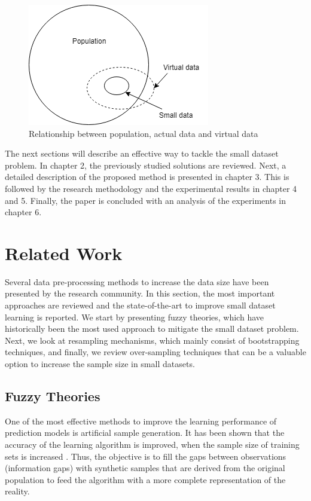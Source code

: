 \documentclass[parskip=full]{scrartcl}
\begin{document}
\begin{figure}[H]
	\centering
	\includegraphics[width=0.35\linewidth]{./resources/relationship}
	\caption{Relationship between population, actual data and virtual data \cite{Li.2006}}
	\label{fig:relationship}
\end{figure}

The next sections will describe an effective way to tackle the small dataset 
problem. In chapter 2, the previously studied solutions are reviewed. Next, a 
detailed description of the proposed method is presented in chapter 3. This is 
followed by the research methodology and the experimental results in chapter 4 
and 5. Finally, the paper is concluded with an analysis of the experiments in 
chapter 6.

\section{Related Work}
Several data pre-processing methods to increase the data size have been
presented by the research community. In this section, the most important
approaches are reviewed and the state-of-the-art to improve small dataset
learning is reported. We start by presenting fuzzy theories, which have 
historically been the most used approach to mitigate the small dataset problem. 
Next, we look at resampling mechanisms, which mainly consist of bootstrapping 
techniques, and finally, we review over-sampling techniques that can be a 
valuable option to increase the sample size in small datasets.

\subsection{Fuzzy Theories}

One of the most effective methods to improve the learning performance of 
prediction models is artificial sample generation. It has been shown that the 
accuracy of the learning algorithm is improved, when the sample size of 
training sets is increased \cite{AbdulLateh.2017}. Thus, the objective is to 
fill the gaps between observations (information gaps) with synthetic samples 
that are derived from the original population to feed the algorithm with a more 
complete representation of the reality.
\end{document}
